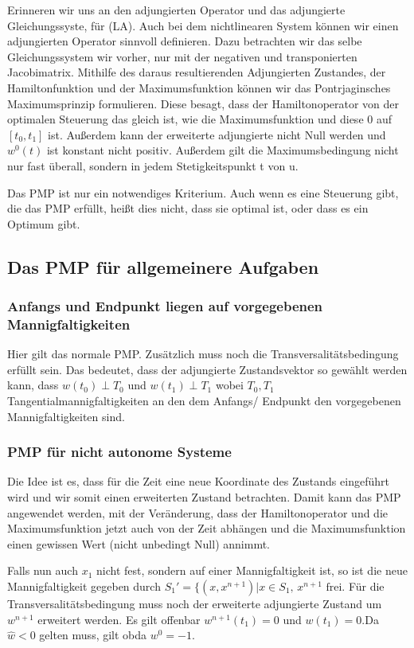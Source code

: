 \documentclass[pdftex,a4paper,oneside]{scrbook}
\begin{document}
Erinneren wir uns an den adjungierten Operator und das adjungierte Gleichungssyste, für (LA). Auch bei dem nichtlinearen System können wir einen adjungierten Operator sinnvoll definieren. Dazu betrachten wir das selbe Gleichungssystem wir vorher, nur mit der negativen und transponierten Jacobimatrix. 
Mithilfe des daraus resultierenden Adjungierten Zustandes, der Hamiltonfunktion und der Maximumsfunktion können wir das Pontrjaginsches Maximumsprinzip formulieren. Diese besagt, dass der Hamiltonoperator von der optimalen Steuerung das gleich ist, wie die Maximumsfunktion und diese 0 auf $[t_0, t_1]$ ist. Außerdem kann der erweiterte adjungierte nicht Null werden und $w^0(t)$ ist konstant nicht positiv.  Außerdem gilt die Maximumsbedingung nicht nur fast überall, sondern in jedem Stetigkeitspunkt t von u.  

Das PMP ist nur ein notwendiges Kriterium. Auch wenn es eine Steuerung gibt, die das PMP erfüllt, heißt dies nicht, dass sie optimal ist, oder dass es ein Optimum gibt.  

\subsection{Das PMP für allgemeinere Aufgaben}

\subsubsection*{Anfangs und Endpunkt liegen auf vorgegebenen Mannigfaltigkeiten}
Hier gilt das normale PMP. Zusätzlich muss noch die Transversalitätsbedingung erfüllt sein. Das bedeutet, dass der adjungierte Zustandsvektor so gewählt werden kann, dass $w(t_0) \perp T_0$ und $w(t_1 ) \perp T_1$ wobei $T_0, T_1$ Tangentialmannigfaltigkeiten an den dem Anfangs/ Endpunkt den vorgegebenen Mannigfaltigkeiten sind.  

\subsubsection*{PMP für nicht autonome Systeme}
Die Idee ist es, dass für die Zeit eine neue Koordinate des Zustands eingeführt wird und wir somit einen erweiterten Zustand betrachten. Damit kann das PMP angewendet werden, mit der Veränderung, dass der Hamiltonoperator und die Maximumsfunktion jetzt auch von der Zeit abhängen und die Maximumsfunktion einen gewissen Wert (nicht unbedingt Null) annimmt. 

Falls nun auch $x_1$ nicht fest, sondern auf einer Mannigfaltigkeit ist, so ist die neue Mannigfaltigkeit gegeben durch $S_1' = \{(x,x^{n+1}) |  x \in S_1 \text{, } x^{n+1} \text{ frei}$. Für die Transversalitätsbedingung muss noch der erweiterte adjungierte Zustand um $w^{n+1} $ erweitert werden. Es gilt offenbar $w^{n+1}(t_1) = 0$ und $w(t_1) = 0$.Da $\hat{w} < 0$ gelten muss, gilt  obda $w^0 = -1$.  
\end{document}
